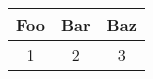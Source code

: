 \begin{table}[h!]
\centering
\begin{tabular}{c|c|c}
	\textbf{Foo} & \textbf{Bar} & \textbf{Baz} \\
	\hline
	1 & 2 & 3 \\
\end{tabular}
\caption[]{}
\label{tab:lena-benchmark-table}
\end{table}
